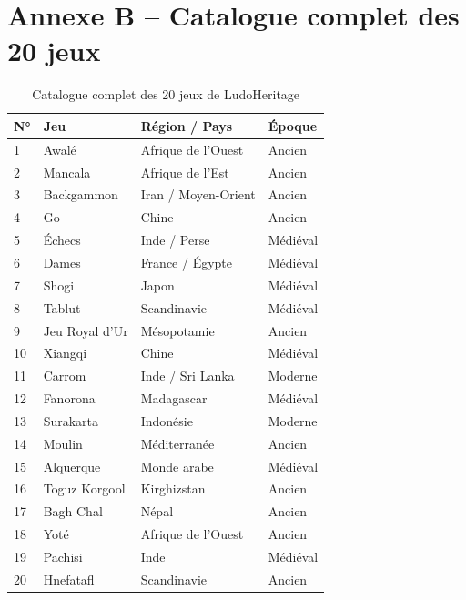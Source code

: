 \documentclass[12pt,a4paper]{report}
\begin{document}
\section*{Annexe B -- Catalogue complet des 20 jeux}

\begin{table}[H]
\centering
\renewcommand{\arraystretch}{1.4}
\begin{tabular}{|p{0.5cm}|p{4.2cm}|p{4.2cm}|p{3cm}|}
\hline
\rowcolor{mainblue!20}
\textbf{N°} & \textbf{Jeu} & \textbf{Région / Pays} & \textbf{Époque} \\
\hline
1  & Awalé          & Afrique de l'Ouest   & Ancien    \\ \hline
2  & Mancala        & Afrique de l'Est     & Ancien    \\ \hline
3  & Backgammon     & Iran / Moyen-Orient  & Ancien    \\ \hline
4  & Go             & Chine                & Ancien    \\ \hline
5  & Échecs         & Inde / Perse         & Médiéval  \\ \hline
6  & Dames          & France / Égypte      & Médiéval  \\ \hline
7  & Shogi          & Japon                & Médiéval  \\ \hline
8  & Tablut         & Scandinavie          & Médiéval  \\ \hline
9  & Jeu Royal d'Ur & Mésopotamie          & Ancien    \\ \hline
10 & Xiangqi        & Chine                & Médiéval  \\ \hline
11 & Carrom         & Inde / Sri Lanka     & Moderne   \\ \hline
12 & Fanorona       & Madagascar           & Médiéval  \\ \hline
13 & Surakarta      & Indonésie            & Moderne   \\ \hline
14 & Moulin         & Méditerranée         & Ancien    \\ \hline
15 & Alquerque      & Monde arabe          & Médiéval  \\ \hline
16 & Toguz Korgool  & Kirghizstan          & Ancien    \\ \hline
17 & Bagh Chal      & Népal                & Ancien    \\ \hline
18 & Yoté           & Afrique de l'Ouest   & Ancien    \\ \hline
19 & Pachisi        & Inde                 & Médiéval  \\ \hline
20 & Hnefatafl      & Scandinavie          & Ancien    \\ \hline
\end{tabular}
\caption*{Catalogue complet des 20 jeux de LudoHeritage}
\end{table}
\end{document}
